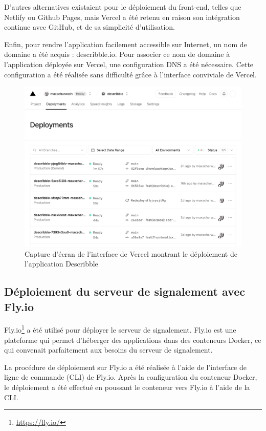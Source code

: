 D'autres alternatives existaient pour le déploiement du front-end, telles que Netlify ou Github Pages, mais Vercel a été retenu en raison son intégration continue avec GitHub, et de sa simplicité d'utilisation.

Enfin, pour rendre l'application facilement accessible sur Internet, un nom de domaine a été acquis : describble.io. Pour associer ce nom de domaine à l'application déployée sur Vercel, une configuration DNS a été nécessaire. Cette configuration a été réalisée sans difficulté grâce à l'interface conviviale de Vercel.

\begin{figure}[H]
    \centering
    \includegraphics[width=1\textwidth]{assets/figures/vercel-deploy.png}
    \caption{Capture d'écran de l'interface de Vercel montrant le déploiement de l'application Describble}
\end{figure}

\subsection{Déploiement du serveur de signalement avec Fly.io}

Fly.io\footnote{\url{https://fly.io/}} a été utilisé pour déployer le serveur de signalement. Fly.io est une plateforme qui permet d'héberger des applications dans des conteneurs Docker, ce qui convenait parfaitement aux besoins du serveur de signalement.

La procédure de déploiement sur Fly.io a été réalisée à l'aide de l'interface de ligne de commande (CLI) de Fly.io. Après la configuration du conteneur Docker, le déploiement a été effectué en poussant le conteneur vers Fly.io à l'aide de la CLI.